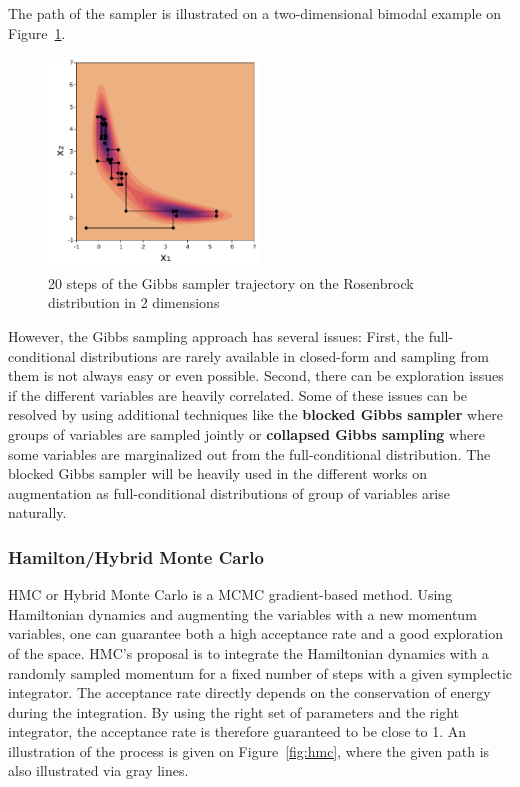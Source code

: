 The path of the sampler is illustrated on a two-dimensional bimodal example on Figure~\ref{fig:gibbs_samp}.

\begin{figure}
\centering
\includegraphics[width=0.5\textwidth]{./chapters/2_background/figures/gibbs_sampling.pdf}
\caption{20 steps of the Gibbs sampler trajectory on the Rosenbrock distribution in 2 dimensions}
\label{fig:gibbs_samp}
\end{figure}

However, the Gibbs sampling approach has several issues:
First, the full-conditional distributions are rarely available in closed-form and sampling from them is not always easy or even possible.
Second, there can be exploration issues if the different variables are heavily correlated.
Some of these issues can be resolved by using additional techniques like the \textbf{blocked Gibbs sampler} \needcite where groups of variables are sampled jointly or \textbf{collapsed Gibbs sampling} \cite{liu1994collapsed} where some variables are marginalized out from the full-conditional distribution.
The blocked Gibbs sampler will be heavily used in the different works on augmentation as full-conditional distributions of group of variables arise naturally.

\subsubsection{Hamilton/Hybrid Monte Carlo}
\label{sec:hmc}
\acf{HMC} or Hybrid Monte Carlo \cite{duane1987hybrid, betancourt2017conceptual} is a \ac{MCMC} gradient-based method.
Using Hamiltonian dynamics and augmenting the variables with a new momentum variables, one can guarantee both a high acceptance rate and a good exploration of the space.
\ac{HMC}'s proposal is to integrate the Hamiltonian dynamics with a randomly sampled momentum for a fixed number of steps with a given symplectic integrator.
The acceptance rate directly depends on the conservation of energy during the integration.
By using the right set of parameters and the right integrator, the acceptance rate is therefore guaranteed to be close to 1.
An illustration of the process is given on Figure~\ref{fig:hmc}, where the given path is also illustrated via gray lines.

